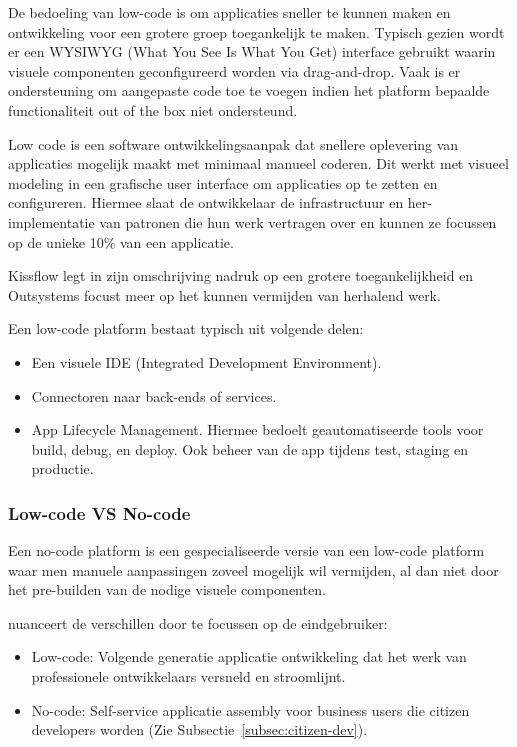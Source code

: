 De bedoeling van low-code is om applicaties sneller te kunnen maken en ontwikkeling voor een grotere groep toegankelijk te maken. Typisch gezien wordt er een WYSIWYG (What You See Is What You Get) interface gebruikt waarin visuele componenten geconfigureerd worden via drag-and-drop. Vaak is er ondersteuning om aangepaste code toe te voegen indien het platform bepaalde functionaliteit out of the box niet ondersteund. \autocite{Kissflow2018}

Low code is een software ontwikkelingsaanpak dat snellere oplevering van applicaties mogelijk maakt met minimaal manueel coderen. Dit werkt met visueel modeling in een grafische user interface om applicaties op te zetten en configureren. Hiermee slaat de ontwikkelaar de infrastructuur en her-implementatie van patronen die hun werk vertragen over en kunnen ze focussen op de unieke 10\% van een applicatie. \autocite{Revell2020}

Kissflow legt in zijn omschrijving nadruk op een grotere toegankelijkheid en Outsystems focust meer op het kunnen vermijden van herhalend werk.

Een low-code platform bestaat typisch uit volgende delen:
\begin{itemize}
    \item Een visuele IDE (Integrated Development Environment).
    \item Connectoren naar back-ends of services.
    \item App Lifecycle Management. Hiermee bedoelt geautomatiseerde tools voor build, debug, en deploy. Ook beheer van de app tijdens test, staging en productie.
\end{itemize} \autocite{Revell2020}

\subsubsection{Low-code VS No-code}

Een no-code platform is een gespecialiseerde versie van een low-code platform waar men manuele aanpassingen zoveel mogelijk wil vermijden, al dan niet door het pre-builden van de nodige visuele componenten.

\textcite{Bloomberg2017} nuanceert de verschillen door te focussen op de eindgebruiker:
\begin{itemize}
    \item Low-code: Volgende generatie applicatie ontwikkeling dat het werk van professionele ontwikkelaars versneld en stroomlijnt.
    \item No-code: Self-service applicatie assembly voor business users die citizen developers worden (Zie Subsectie~\ref{subsec:citizen-dev}).
\end{itemize}

